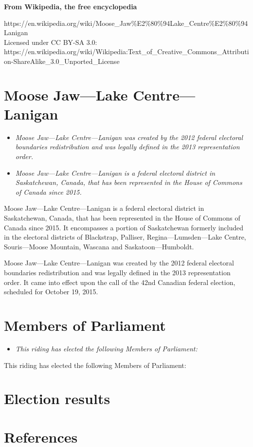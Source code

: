 \textbf{From Wikipedia, the free encyclopedia}

https://en.wikipedia.org/wiki/Moose\_Jaw\%E2\%80\%94Lake\_Centre\%E2\%80\%94Lanigan\\
Licensed under CC BY-SA 3.0:\\
https://en.wikipedia.org/wiki/Wikipedia:Text\_of\_Creative\_Commons\_Attribution-ShareAlike\_3.0\_Unported\_License

\section{Moose Jaw---Lake
Centre---Lanigan}\label{moose-jawlake-centrelanigan}

\begin{itemize}
\item
  \emph{Moose Jaw---Lake Centre---Lanigan was created by the 2012
  federal electoral boundaries redistribution and was legally defined in
  the 2013 representation order.}
\item
  \emph{Moose Jaw---Lake Centre---Lanigan is a federal electoral
  district in Saskatchewan, Canada, that has been represented in the
  House of Commons of Canada since 2015.}
\end{itemize}

Moose Jaw---Lake Centre---Lanigan is a federal electoral district in
Saskatchewan, Canada, that has been represented in the House of Commons
of Canada since 2015. It encompasses a portion of Saskatchewan formerly
included in the electoral districts of Blackstrap, Palliser,
Regina---Lumsden---Lake Centre, Souris---Moose Mountain, Wascana and
Saskatoon---Humboldt.

Moose Jaw---Lake Centre---Lanigan was created by the 2012 federal
electoral boundaries redistribution and was legally defined in the 2013
representation order. It came into effect upon the call of the 42nd
Canadian federal election, scheduled for October 19, 2015.

\section{Members of Parliament}\label{members-of-parliament}

\begin{itemize}
\item
  \emph{This riding has elected the following Members of Parliament:}
\end{itemize}

This riding has elected the following Members of Parliament:

\section{Election results}\label{election-results}

\section{References}\label{references}

